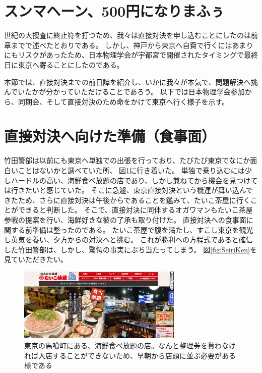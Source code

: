 
\section{スンマヘーン、500円になりまふぅ}
世紀の大捜査に終止符を打つため、我々は直接対決を申し込むことにしたのは前章までで述べたとおりである。
しかし、神戸から東京へ自費で行くにはあまりにもリスクがあったため、日本物理学会が宇都宮で開催されたタイミングで最終日に東京へ寄ることにしたのである。

本節では、直接対決までの前日譚を紹介し、いかに我々が本気で、問題解決へ挑んでいたかが分かっていただけることであろう。
以下では日本物理学会参加から、同期会、そして直接対決のため命をかけて東京へ行く様子を示す。


\section{直接対決へ向けた準備（食事面）}
竹田警部は以前にも東京へ単独での出張を行っており、たびたび東京でなにか面白いことはないかと調べていた所、
図\ref{fig:TaikoChaya}に行き着いた。
単独で乗り込むには少しハードルの高い、海鮮食べ放題の店であり、しかし兼ねてから機会を見つけては行きたいと感じていた。
そこに急遽、東京直接対決という機運が舞い込んできたため、さらに直接対決は午後からであることを鑑みて、たいこ茶屋に行くことができると判断した。
そこで、直接対決に同伴するオガワマンもたいこ茶屋参戦の提案を行い、海鮮好きな彼の了承も取り付けた。
直接対決への食事面に関する前準備は整ったのである。
たいこ茶屋で腹を満たし、すこし東京を観光し英気を養い、夕方からの対決へと挑む。
これが勝利への方程式であると確信した竹田警部は、しかし、驚愕の事実にぶち当たってしまう。
図\ref{fig:SeiriKen}を見ていただきたい。

\begin{figure}[htbp]
  \begin{center}
    \includegraphics[width=0.7\textwidth]{./section/sasakiLIVE/figures/TaikoChaya.png}
  \end{center}
  \caption{東京の馬喰町にある、海鮮食べ放題の店。なんと整理券を貰わなければ入店することができないため、早朝から店頭に並ぶ必要がある様である}
  \label{fig:TaikoChaya}
\end{figure}

